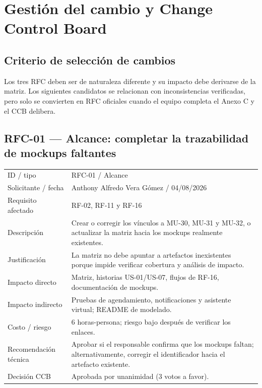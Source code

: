 \documentclass[11pt,a4paper]{article}
\begin{document}
	\section{Gestión del cambio y Change Control Board}
	\subsection{Criterio de selección de cambios}
	Los tres RFC deben ser de naturaleza diferente y su impacto debe derivarse de la matriz. Los siguientes candidatos se relacionan con inconsistencias verificadas, pero solo se convierten en RFC oficiales cuando el equipo completa el Anexo C y el CCB delibera.
	
	\subsection{RFC-01 --- Alcance: completar la trazabilidad de mockups faltantes}
	\begin{tabularx}{\textwidth}{p{4.2cm}X}
		\toprule
		ID / tipo & RFC-01 / Alcance\\
		Solicitante / fecha & Anthony Alfredo Vera Gómez / 04/08/2026\\
		Requisito afectado & RF-02, RF-11 y RF-16\\
		Descripción & Crear o corregir los vínculos a MU-30, MU-31 y MU-32, o actualizar la matriz hacia los mockups realmente existentes.\\
		Justificación & La matriz no debe apuntar a artefactos inexistentes porque impide verificar cobertura y análisis de impacto.\\
		Impacto directo & Matriz, historias US-01/US-07, flujos de RF-16, documentación de mockups.\\
		Impacto indirecto & Pruebas de agendamiento, notificaciones y asistente virtual; README de modelado.\\
		Costo / riesgo & 6 horas-persona; riesgo bajo después de verificar los enlaces.\\
		Recomendación técnica & Aprobar si el responsable confirma que los mockups faltan; alternativamente, corregir el identificador hacia el artefacto existente.\\
		Decisión CCB & Aprobada por unanimidad (3 votos a favor).\\
		\bottomrule
	\end{tabularx}
	
\end{document}
